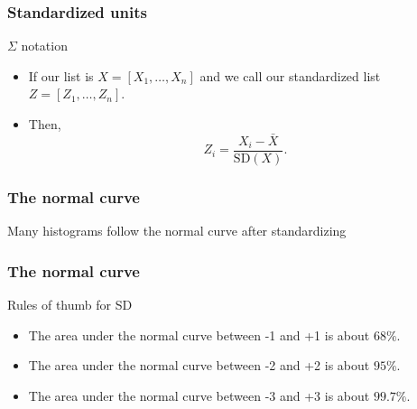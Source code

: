 \documentclass[handout]{beamer}
\begin{document}

   \begin{frame} \frametitle{Standardized units}

   \begin{block}
   {$\Sigma$ notation}
   \begin{itemize}
   \item If our list is $X=[X_1, \dots, X_n]$ and we call our
   standardized list $Z=[Z_1, \dots, Z_n]$.

   \item Then,
   $$
   Z_i = \frac{X_i - \bar{X}}{\text{SD}(X)}.
   $$
   \end{itemize}
   \end{block}
   \end{frame}



   \begin{frame}
   \frametitle{The normal curve}
   \begin{center}
   \end{center}
   Many histograms follow the normal curve after standardizing
   \end{frame}


   \begin{frame} \frametitle{The normal curve}

   \begin{block}
   {Rules of thumb for SD}
   \begin{itemize}
   \item The area under the normal curve between -1 and +1 is about $68\%$.
   \item The area under the normal curve between -2 and +2 is about $95\%$.
   \item The area under the normal curve between -3 and +3 is about $99.7\%$.
   \end{itemize}
   \end{block}
   \end{frame}
\end{document}
